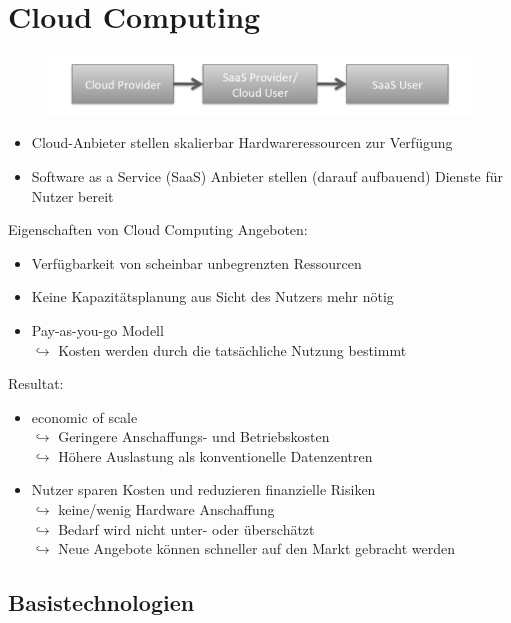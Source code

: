 \documentclass[a4paper,10pt]{scrreprt}
\begin{document}
	\section{Cloud Computing}
	\begin{figure}[ht]
		\centering
		\includegraphics[width=1\textwidth]{images/cloud_computing}
	\end{figure}
	\begin{itemize}
		\item Cloud-Anbieter stellen skalierbar Hardwareressourcen zur Verfügung
		\item Software as a Service (SaaS) Anbieter stellen (darauf aufbauend) Dienste für Nutzer bereit
	\end{itemize}
	Eigenschaften von Cloud Computing Angeboten:
	\begin{itemize}
		\item Verfügbarkeit von scheinbar unbegrenzten Ressourcen
		\item Keine Kapazitätsplanung aus Sicht des Nutzers mehr nötig
		\item Pay-as-you-go Modell\\[5pt]
			$\hookrightarrow$ Kosten werden durch die tatsächliche Nutzung bestimmt
	\end{itemize}
	Resultat:
	\begin{itemize}
		\item economic of scale\\[5pt]
		$\hookrightarrow$ Geringere Anschaffungs- und Betriebskosten\\[5pt]
		$\hookrightarrow$ Höhere Auslastung als konventionelle Datenzentren
		\item Nutzer sparen Kosten und reduzieren finanzielle Risiken\\[5pt]
		$\hookrightarrow$ keine/wenig Hardware Anschaffung\\[5pt]
		$\hookrightarrow$ Bedarf wird nicht unter- oder überschätzt\\[5pt]
		$\hookrightarrow$ Neue Angebote können schneller auf den Markt gebracht werden
	\end{itemize}
	\subsection{Basistechnologien}
\end{document}
